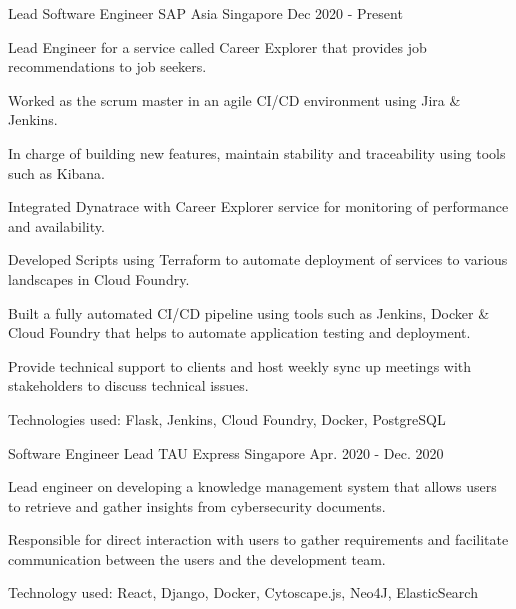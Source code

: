 

\begin{cventries}

  \cventry
    {Lead Software Engineer} %
    {SAP Asia} %
    {Singapore} %
    {Dec 2020 - Present} %
    {
      \begin{cvitems} %
        \item {Lead Engineer for a service called Career Explorer that provides job recommendations to job seekers.}
        \item {Worked as the scrum master in an agile CI/CD environment using Jira \& Jenkins.}
        \item {In charge of building new features, maintain stability and traceability using tools such as Kibana.}
        \item {Integrated Dynatrace with Career Explorer service for monitoring of performance and availability.}
        \item {Developed Scripts using Terraform to automate deployment of services to various landscapes in Cloud Foundry.}
        \item {Built a fully automated CI/CD pipeline using tools such as Jenkins, Docker \& Cloud Foundry that helps to automate application testing and deployment.}
        \item {Provide technical support to clients and host weekly sync up meetings with stakeholders to discuss technical issues.}
        \item {Technologies used: Flask, Jenkins, Cloud Foundry, Docker, PostgreSQL}
      \end{cvitems}
    }

  \cventry
    {Software Engineer Lead} %
    {TAU Express} %
    {Singapore} %
    {Apr. 2020 - Dec. 2020} %
    {
      \begin{cvitems} %
        \item {Lead engineer on developing a knowledge management system that allows users to retrieve and gather insights from cybersecurity documents.}
        \item {Responsible for direct interaction with users to gather requirements and facilitate communication between the users and the development team.}
        \item {Technology used: React, Django, Docker, Cytoscape.js, Neo4J, ElasticSearch}
     \end{cvitems}
    }


\end{cventries}
